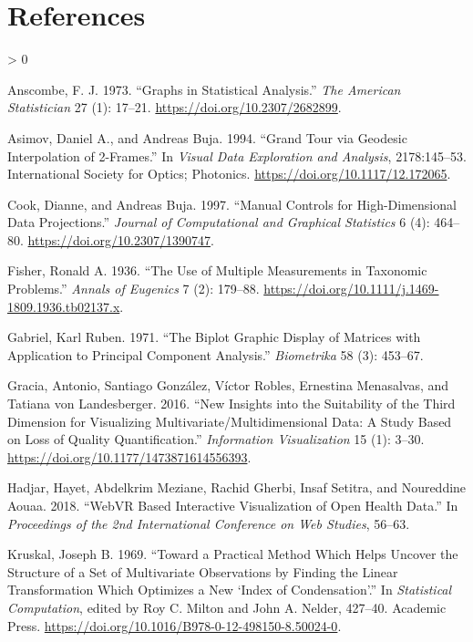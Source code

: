 \documentclass[
  11,
]{article}
\newlength{\cslhangindent}
\newenvironment{CSLReferences}[2] %
 {%
  \setlength{\parindent}{0pt}
  \ifodd #1 \everypar{\setlength{\hangindent}{\cslhangindent}}\ignorespaces\fi
  \ifnum #2 > 0
  \setlength{\parskip}{#2\baselineskip}
  \fi
 }%
 {}
\begin{document}
\hypertarget{references}{%
\section*{References}\label{references}}

\hypertarget{refs}{}
\begin{CSLReferences}{1}{0}
\leavevmode\hypertarget{ref-anscombe_graphs_1973}{}%
Anscombe, F. J. 1973. {``Graphs in Statistical Analysis.''} \emph{The American Statistician} 27 (1): 17--21. \url{https://doi.org/10.2307/2682899}.

\leavevmode\hypertarget{ref-asimov_grand_1994}{}%
Asimov, Daniel A., and Andreas Buja. 1994. {``Grand Tour via Geodesic Interpolation of 2-Frames.''} In \emph{Visual Data Exploration and Analysis}, 2178:145--53. International Society for Optics; Photonics. \url{https://doi.org/10.1117/12.172065}.

\leavevmode\hypertarget{ref-cook_manual_1997}{}%
Cook, Dianne, and Andreas Buja. 1997. {``Manual Controls for High-Dimensional Data Projections.''} \emph{Journal of Computational and Graphical Statistics} 6 (4): 464--80. \url{https://doi.org/10.2307/1390747}.

\leavevmode\hypertarget{ref-fisher_use_1936}{}%
Fisher, Ronald A. 1936. {``The Use of Multiple Measurements in Taxonomic Problems.''} \emph{Annals of Eugenics} 7 (2): 179--88. \url{https://doi.org/10.1111/j.1469-1809.1936.tb02137.x}.

\leavevmode\hypertarget{ref-gabriel_biplot_1971}{}%
Gabriel, Karl Ruben. 1971. {``The Biplot Graphic Display of Matrices with Application to Principal Component Analysis.''} \emph{Biometrika} 58 (3): 453--67.

\leavevmode\hypertarget{ref-gracia_new_2016}{}%
Gracia, Antonio, Santiago González, Víctor Robles, Ernestina Menasalvas, and Tatiana von Landesberger. 2016. {``New Insights into the Suitability of the Third Dimension for Visualizing Multivariate/Multidimensional Data: A Study Based on Loss of Quality Quantification.''} \emph{Information Visualization} 15 (1): 3--30. \url{https://doi.org/10.1177/1473871614556393}.

\leavevmode\hypertarget{ref-hadjar_webvr_2018}{}%
Hadjar, Hayet, Abdelkrim Meziane, Rachid Gherbi, Insaf Setitra, and Noureddine Aouaa. 2018. {``{WebVR} Based Interactive Visualization of Open Health Data.''} In \emph{Proceedings of the 2nd International Conference on Web Studies}, 56--63.

\leavevmode\hypertarget{ref-kruskal_toward_1969}{}%
Kruskal, Joseph B. 1969. {``Toward a Practical Method Which Helps Uncover the Structure of a Set of Multivariate Observations by Finding the Linear Transformation Which Optimizes a New {`Index of Condensation'}.''} In \emph{Statistical Computation}, edited by Roy C. Milton and John A. Nelder, 427--40. Academic Press. \url{https://doi.org/10.1016/B978-0-12-498150-8.50024-0}.


\end{CSLReferences}
\end{document}
